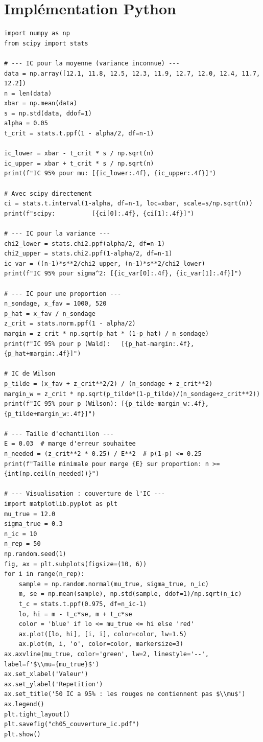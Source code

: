 \section{Impl\'ementation Python}

\begin{python}
\begin{verbatim}
import numpy as np
from scipy import stats

# --- IC pour la moyenne (variance inconnue) ---
data = np.array([12.1, 11.8, 12.5, 12.3, 11.9, 12.7, 12.0, 12.4, 11.7, 12.2])
n = len(data)
xbar = np.mean(data)
s = np.std(data, ddof=1)
alpha = 0.05
t_crit = stats.t.ppf(1 - alpha/2, df=n-1)

ic_lower = xbar - t_crit * s / np.sqrt(n)
ic_upper = xbar + t_crit * s / np.sqrt(n)
print(f"IC 95% pour mu: [{ic_lower:.4f}, {ic_upper:.4f}]")

# Avec scipy directement
ci = stats.t.interval(1-alpha, df=n-1, loc=xbar, scale=s/np.sqrt(n))
print(f"scipy:          [{ci[0]:.4f}, {ci[1]:.4f}]")

# --- IC pour la variance ---
chi2_lower = stats.chi2.ppf(alpha/2, df=n-1)
chi2_upper = stats.chi2.ppf(1-alpha/2, df=n-1)
ic_var = ((n-1)*s**2/chi2_upper, (n-1)*s**2/chi2_lower)
print(f"IC 95% pour sigma^2: [{ic_var[0]:.4f}, {ic_var[1]:.4f}]")

# --- IC pour une proportion ---
n_sondage, x_fav = 1000, 520
p_hat = x_fav / n_sondage
z_crit = stats.norm.ppf(1 - alpha/2)
margin = z_crit * np.sqrt(p_hat * (1-p_hat) / n_sondage)
print(f"IC 95% pour p (Wald):   [{p_hat-margin:.4f}, {p_hat+margin:.4f}]")

# IC de Wilson
p_tilde = (x_fav + z_crit**2/2) / (n_sondage + z_crit**2)
margin_w = z_crit * np.sqrt(p_tilde*(1-p_tilde)/(n_sondage+z_crit**2))
print(f"IC 95% pour p (Wilson): [{p_tilde-margin_w:.4f}, {p_tilde+margin_w:.4f}]")

# --- Taille d'echantillon ---
E = 0.03  # marge d'erreur souhaitee
n_needed = (z_crit**2 * 0.25) / E**2  # p(1-p) <= 0.25
print(f"Taille minimale pour marge {E} sur proportion: n >= {int(np.ceil(n_needed))}")

# --- Visualisation : couverture de l'IC ---
import matplotlib.pyplot as plt
mu_true = 12.0
sigma_true = 0.3
n_ic = 10
n_rep = 50
np.random.seed(1)
fig, ax = plt.subplots(figsize=(10, 6))
for i in range(n_rep):
    sample = np.random.normal(mu_true, sigma_true, n_ic)
    m, se = np.mean(sample), np.std(sample, ddof=1)/np.sqrt(n_ic)
    t_c = stats.t.ppf(0.975, df=n_ic-1)
    lo, hi = m - t_c*se, m + t_c*se
    color = 'blue' if lo <= mu_true <= hi else 'red'
    ax.plot([lo, hi], [i, i], color=color, lw=1.5)
    ax.plot(m, i, 'o', color=color, markersize=3)
ax.axvline(mu_true, color='green', lw=2, linestyle='--', label=f'$\\mu={mu_true}$')
ax.set_xlabel('Valeur')
ax.set_ylabel('Repetition')
ax.set_title('50 IC a 95% : les rouges ne contiennent pas $\\mu$')
ax.legend()
plt.tight_layout()
plt.savefig("ch05_couverture_ic.pdf")
plt.show()
\end{verbatim}
\end{python}

